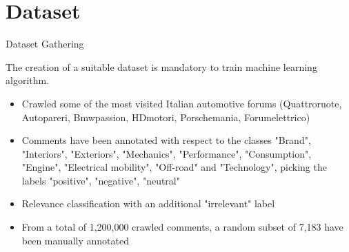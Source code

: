 \documentclass{beamer}
\begin{document}
	\section{Dataset}
	
	\begin{frame}{Dataset Gathering}
		
		The creation of a suitable dataset is mandatory to train machine learning algorithm.
		\begin{itemize}
			\item Crawled some of the most visited Italian automotive forums (Quattroruote, Autopareri, Bmwpassion, HDmotori, Porschemania, Forumelettrico)
			\item Comments have been annotated with respect to the classes "Brand", "Interiors", "Exteriors", "Mechanics", "Performance", "Consumption", "Engine", "Electrical mobility", "Off-road" and "Technology", picking the labels "positive", "negative", "neutral"
			\item Relevance classification with an additional "irrelevant" label
			\item From a total of 1,200,000 crawled comments, a random subset of 7,183 have been manually annotated
		\end{itemize}
		
	\end{frame}
	
\end{document}
